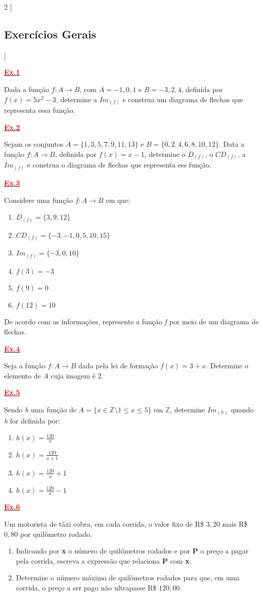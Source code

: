 \documentclass[12pt]{report}
\newcommand{\ex}[1]{\hypertarget{ex#1}{\noindent\hyperlink{gab#1}{\textcolor{red}{\textbf{Ex.#1}}}}}
\begin{document}
\begin{multicols}{2}
[
\begin{center}
\section*{Exercícios Gerais}
\end{center}
]
\changefontsizes[9pt]{9pt}

\ex{1} Dada a função $f:A \rightarrow B$, com $A={-1,0,1}$ e $B={-3,2,4}$, definida por $f(x) = 5x^2 - 3$, determine a $Im_{(f)}$ e construa um diagrama de flechas que representa essa função.

\ex{2} Sejam os conjuntos $A=\{1,3,5,7,9,11,13\}$ e $B=\{0,2,4,6,8,10,12\}$. Data a função $f:A \rightarrow B$, definida por $f(x) = x - 1$, determine o $D_{(f)}$, o $CD_{(f)}$, a $Im_{(f)}$ e construa o diagrama de flechas que representa ess função.

\ex{3} Considere uma função $f:A \rightarrow B$ em que:
\begin{enumerate}[label=\alph*)]
	\item $D_{(f)} = \{3,9,12\}$
	\item $CD_{(f)} = \{-3,-1,0,5,10,15\}$
	\item $Im_{(f)} = \{-3,0,10\}$
	\item $f(3) = -3$
	\item $f(9) = 0$
	\item $f(12) = 10$
\end{enumerate}
De acordo com as informações, represente a função \textit{f} por meio de um diagrama de flechas.

\ex{4} Seja a função $f:A \rightarrow B$ dada pela lei de formação $f(x)=3+x$. Determine o elemento de \textit{A} cuja imagem é $2$.

\ex{5} Sendo \textit{h} uma função de $A=\{x \in \mathbb{Z} \setminus 1 \leqslant x \leqslant 5\}$ em $\mathbb{Z}$, determine $Im_{(h)}$ quando \textit{h} for definida por:
\begin{enumerate}[label=\alph*)]
	\item $h(x) = \frac{120}{x} $
	\item $h(x) = \frac{120}{x+1} $
	\item $h(x) = \frac{120}{x}+1 $
	\item $h(x) = \frac{120}{x}-1 $
\end{enumerate}

	

\ex{6} Um motorista de táxi cobra, em cada corrida, o valor fixo de R\$ $3,20$ mais R\$ $0,80$ por quilômetro rodado.
\begin{enumerate}[label=\alph*)]
	\item Indicando por \textbf{x} o número de quilômetros rodados e por \textbf{P} o preço a pagar pela corrida, escreva a expressão que relaciona \textbf{P} com \textbf{x}. 
	\item Determine o número máximo de quilômetros rodados para que, em uma corrida, o preço a ser pago não ultrapasse R\$ $120,00$.
\end{enumerate}


\end{multicols}
\end{document}
